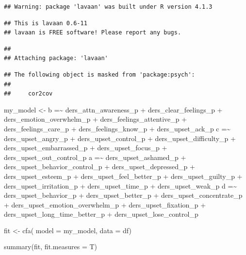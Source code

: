 \documentclass[
]{book}
\newenvironment{Shaded}{\begin{snugshade}}{\end{snugshade}}
\newcommand{\AttributeTok}[1]{\textcolor[rgb]{0.77,0.63,0.00}{#1}}
\newcommand{\FunctionTok}[1]{\textcolor[rgb]{0.00,0.00,0.00}{#1}}
\newcommand{\NormalTok}[1]{#1}
\newcommand{\OtherTok}[1]{\textcolor[rgb]{0.56,0.35,0.01}{#1}}
\newcommand{\StringTok}[1]{\textcolor[rgb]{0.31,0.60,0.02}{#1}}
\begin{document}
\begin{verbatim}
## Warning: package 'lavaan' was built under R version 4.1.3
\end{verbatim}

\begin{verbatim}
## This is lavaan 0.6-11
## lavaan is FREE software! Please report any bugs.
\end{verbatim}

\begin{verbatim}
## 
## Attaching package: 'lavaan'
\end{verbatim}

\begin{verbatim}
## The following object is masked from 'package:psych':
## 
##     cor2cov
\end{verbatim}

\begin{Shaded}
\begin{Highlighting}[]
\NormalTok{my\_model }\OtherTok{\textless{}{-}} \StringTok{\textquotesingle{}}
\StringTok{  b =\textasciitilde{} ders\_attn\_awareness\_p + ders\_clear\_feelings\_p + }
\StringTok{    ders\_emotion\_overwhelm\_p + ders\_feelings\_attentive\_p + }
\StringTok{    ders\_feelings\_care\_p + ders\_feelings\_know\_p + ders\_upset\_ack\_p}
\StringTok{  }
\StringTok{  c =\textasciitilde{} ders\_upset\_angry\_p + ders\_upset\_control\_p + }
\StringTok{    ders\_upset\_difficulty\_p + ders\_upset\_embarrassed\_p + }
\StringTok{    ders\_upset\_focus\_p + ders\_upset\_out\_control\_p}
\StringTok{  }
\StringTok{  a =\textasciitilde{} ders\_upset\_ashamed\_p + ders\_upset\_behavior\_control\_p + }
\StringTok{    ders\_upset\_depressed\_p + ders\_upset\_esteem\_p + }
\StringTok{    ders\_upset\_feel\_better\_p + ders\_upset\_guilty\_p + }
\StringTok{    ders\_upset\_irritation\_p + ders\_upset\_time\_p + }
\StringTok{    ders\_upset\_weak\_p}
\StringTok{  }
\StringTok{  d =\textasciitilde{} ders\_upset\_behavior\_p + ders\_upset\_better\_p + }
\StringTok{    ders\_upset\_concentrate\_p + ders\_upset\_emotion\_overwhelm\_p + }
\StringTok{    ders\_upset\_fixation\_p + ders\_upset\_long\_time\_better\_p + }
\StringTok{    ders\_upset\_lose\_control\_p}
\StringTok{\textquotesingle{}}

\NormalTok{fit }\OtherTok{\textless{}{-}} \FunctionTok{cfa}\NormalTok{(}
  \AttributeTok{model =}\NormalTok{ my\_model,}
  \AttributeTok{data =}\NormalTok{ df)}

\FunctionTok{summary}\NormalTok{(fit, }\AttributeTok{fit.measures =}\NormalTok{ T)}
\end{Highlighting}
\end{Shaded}
\end{document}
